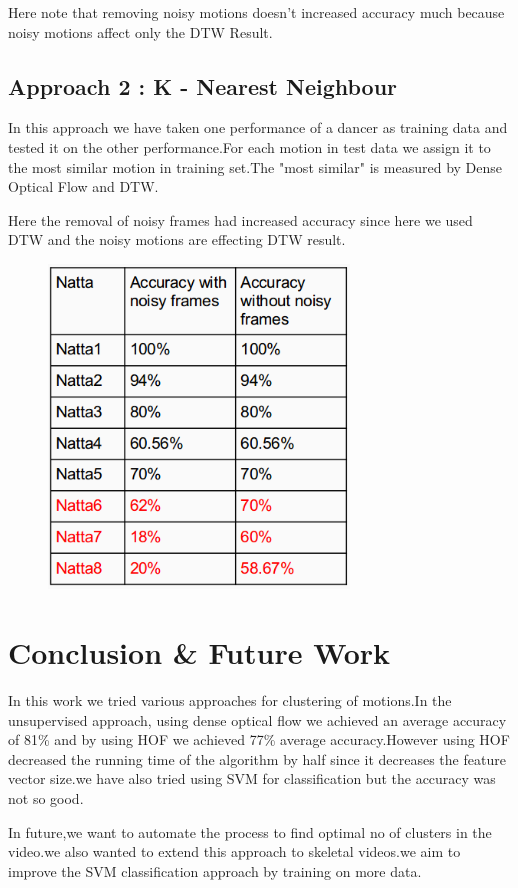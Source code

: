 Here note that removing noisy motions doesn't increased accuracy much because noisy motions affect only the DTW Result.

\subsection{Approach 2 : K - Nearest Neighbour}

In this approach we have taken one performance of a dancer as training data and tested it on the other performance.For each motion in test data we assign it to the most similar motion in training set.The "most similar" is measured by Dense Optical Flow and DTW.

Here the removal of noisy frames had increased accuracy since here we used DTW and the noisy motions are effecting DTW result.

\begin{figure} [H]
\centering
\includegraphics[width=80mm]{Pictures/KNN_res.png}
\end{figure}




\section{Conclusion \& Future Work }

In this work we tried  various approaches for clustering of motions.In the unsupervised approach, using dense optical flow we achieved an average accuracy of 81\% and by using HOF we achieved 77\% average accuracy.However using HOF decreased the running time of the algorithm by half since it decreases the feature vector size.we have also tried using SVM for classification but the accuracy was not so good.

In future,we want to automate the process to find optimal no of clusters in the video.we also wanted to extend this approach to skeletal videos.we aim to improve the SVM classification approach by training on more data.






